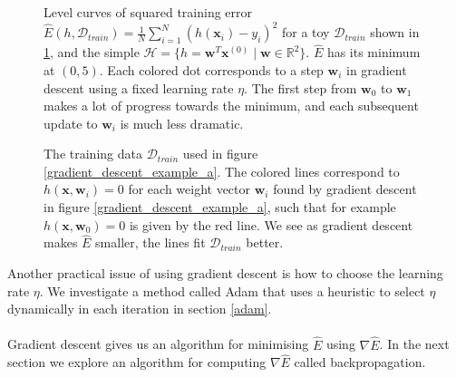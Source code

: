 \begin{figure}
	\hspace{9mm}
	\caption{Level curves of squared training error $\hat{E}(h, \mathcal{D}_{train}) = \frac{1}{N}\sum_{i=1}^N(h(\mathbf{x}_i) - y_i)^2$ for a toy $\mathcal{D}_{train}$ shown in \ref{gradient_descent_example_b}, and the simple $\mathcal{H} = \{h = \mathbf{w}^T\mathbf{x}^{(0)} \mid \mathbf{w} \in \mathbb{R}^2\}$. $\hat{E}$ has its minimum at $(0, 5)$. Each colored dot corresponds to a step $\mathbf{w}_i$ in gradient descent using a fixed learning rate $\eta$. The first step from $\mathbf{w}_0$ to $\mathbf{w}_1$ makes a lot of progress towards the minimum, and each subsequent update to $\mathbf{w}_i$ is much less dramatic.}
	\label{gradient_descent_example_a}
	\vspace{10mm}
	
	\caption{The training data $\mathcal{D}_{train}$ used in figure \ref{gradient_descent_example_a}. The colored lines correspond to $h(\mathbf{x}, \mathbf{w}_i) = 0$ for each weight vector $\mathbf{w}_i$ found by gradient descent in figure \ref{gradient_descent_example_a}, such that for example $h(\mathbf{x}, \mathbf{w}_0) = 0$ is given by the red line. We see as gradient descent makes $\hat{E}$ smaller, the lines fit $\mathcal{D}_{train}$ better.}
	\label{gradient_descent_example_b}
\end{figure}
\noindent
Another practical issue of using gradient descent is how to choose the learning rate $\eta$. We investigate a method called Adam that uses a heuristic to select $\eta$ dynamically in each iteration in section \ref{adam}.
\\\\
Gradient descent gives us an algorithm for minimising $\hat{E}$ using $\nabla\hat{E}$. In the next section we explore an algorithm for computing $\nabla\hat{E}$ called backpropagation.


